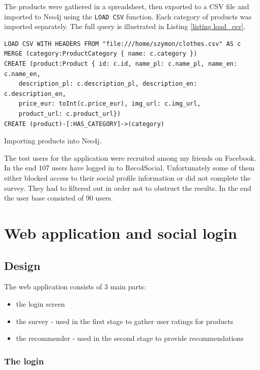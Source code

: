 \documentclass[12pt]{report}
\begin{document}
The products were gathered in a spreadsheet, then exported to a CSV file and imported to Neo4j using the \texttt{LOAD CSV} function. Each category of products was imported separately. The full query is illustrated in Listing \ref{listing.load_csv}.


\begin{listing}
\begin{verbatim}
LOAD CSV WITH HEADERS FROM "file:///home/szymon/clothes.csv" AS c
MERGE (category:ProductCategory { name: c.category })
CREATE (product:Product { id: c.id, name_pl: c.name_pl, name_en: c.name_en, 
    description_pl: c.description_pl, description_en: c.description_en, 
    price_eur: toInt(c.price_eur), img_url: c.img_url, 
    product_url: c.product_url})
CREATE (product)-[:HAS_CATEGORY]->(category)
\end{verbatim}
\caption{Importing products into Neo4j.}
\label{listing.load_csv}
\end{listing}

The test users for the application were recruited among my friends on Facebook. In the end 107 users have logged in to Reco4Social. Unfortunately some of them either blocked access to their social profile information or did not complete the survey. They had to filtered out in order not to obstruct the results. In the end the user base consisted of 90 users.

\section{Web application and social login}
\subsection{Design}

The web application consists of 3 main parts:
\begin{itemize}
\item the login screen
\item the survey - used in the first stage to gather user ratings for products
\item the recommender - used in the second stage to provide recommendations
\end{itemize}

\subsubsection{The login}
\end{document}
